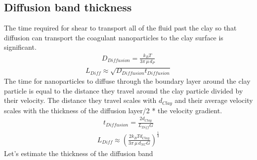 \documentclass[letterpaper,10pt,english]{sphinxmanual}
\begin{document}
\subsection{Diffusion band thickness}
\label{\detokenize{Rapid_Mix/RM_Theory_and_Future_Work:diffusion-band-thickness}}
The time required for shear to transport all of the fluid past the clay so that diffusion can transport the coagulant nanoparticles to the clay surface is significant.
\begin{equation}\label{equation:Rapid_Mix/RM_Theory_and_Future_Work:Rapid_Mix/RM_Theory_and_Future_Work:23}
\begin{split}D_{Diffusion} = \frac{k_B T}{3 \pi \, \mu \, d_P}\end{split}
\end{equation}\begin{equation}\label{equation:Rapid_Mix/RM_Theory_and_Future_Work:Rapid_Mix/RM_Theory_and_Future_Work:24}
\begin{split}L_{Diff} \approx \sqrt{D_{Diffusion} t_{Diffusion}}\end{split}
\end{equation}
The time for nanoparticles to diffuse through the boundary layer around the clay particle is equal to the distance they travel around the clay particle divided by their velocity. The distance they travel scales with \(d_{Clay}\) and their average velocity scales with the thickness of the diffusion layer/2 * the velocity gradient.
\begin{equation}\label{equation:Rapid_Mix/RM_Theory_and_Future_Work:Rapid_Mix/RM_Theory_and_Future_Work:25}
\begin{split}t_{Diffusion} = \frac{ 2d_{Clay}} {L_{Diff} G}\end{split}
\end{equation}\begin{equation}\label{equation:Rapid_Mix/RM_Theory_and_Future_Work:Rapid_Mix/RM_Theory_and_Future_Work:26}
\begin{split}L_{Diff} \approx \left( \frac{2k_B T d_{Clay}}{3 \pi \,\mu  \, d_{NC} G}\right)^\frac{1}{3}\end{split}
\end{equation}
Let’s estimate the thickness of the diffusion band
\end{document}
